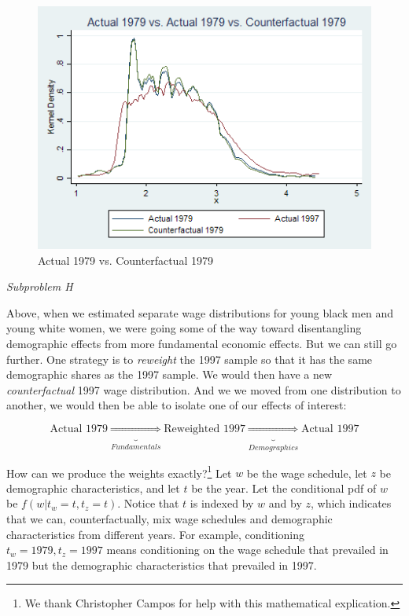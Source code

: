 \documentclass[11pt]{article}
\begin{document}
\begin{figure}[H]
	\caption{Actual 1979 vs. Counterfactual 1979}
	\centering
	\includegraphics[width=.75\textwidth]{Kernel_Density_1979_C1979.png}
\end{figure}


\textit{Subproblem H}

\bigskip Above, when we estimated separate wage distributions for young black men and young white women, we were going some of the way toward disentangling demographic effects from more fundamental economic effects. But we can still go further. One strategy is to \textit{reweight} the 1997 sample so that it has the same demographic shares as the 1997 sample. We would then have a new \textit{counterfactual} 1997 wage distribution. And we we moved from one distribution to another, we would then be able to isolate one of our effects of interest:

$$ \text{Actual 1979} \underbrace{\Rightarrow}_{Fundamentals} \text{Reweighted 1997} \underbrace{\Rightarrow}_{Demographics} \text{Actual 1997} $$

\bigskip How can we produce the weights exactly?\footnote{We thank Christopher Campos for help with this mathematical explication.} Let $w$ be the wage schedule, let $z$ be demographic characteristics, and let $t$ be the year. Let the conditional pdf of $w$ be $f(w|t_w=t,t_z=t)$. Notice that $t$ is indexed by $w$ and by $z$, which indicates that we can, counterfactually, mix wage schedules and demographic characteristics from different years. For example, conditioning $t_w=1979,t_z=1997$ means conditioning on the wage schedule that prevailed in 1979 but the demographic characteristics that prevailed in 1997.
\end{document}
